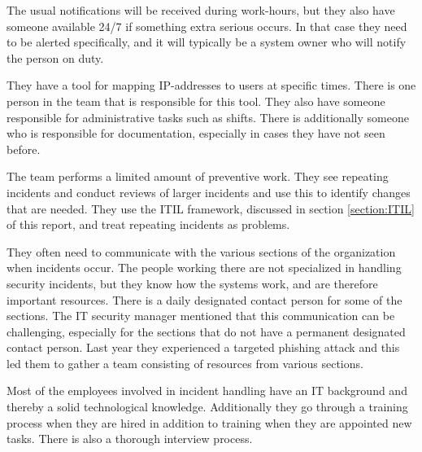 The usual notifications will be received during work-hours, but they also have someone available 24/7 if something extra serious occurs. In that case they need to be alerted specifically, and it will typically be a system owner who will notify the person on duty.

They have a tool for mapping IP-addresses to users at specific times. There is one person in the team that is responsible for this tool. They also have someone responsible for administrative tasks such as shifts. There is additionally someone who is responsible for documentation, especially in cases they have not seen before.

The team performs a limited amount of preventive work. They see repeating incidents and conduct reviews of larger incidents and use this to identify changes that are needed. They use the \ac{ITIL} framework, discussed in section \ref{section:ITIL} of this report, and treat repeating incidents as problems.

They often need to communicate with the various sections of the organization when incidents occur. The people working there are not specialized in handling security incidents, but they know how the systems work, and are therefore important resources. There is a daily designated contact person for some of the sections. The IT security manager mentioned that this communication can be challenging, especially for the sections that do not have a permanent designated contact person. Last year they experienced a targeted phishing attack and this led them to gather a team consisting of resources from various sections.

Most of the employees involved in incident handling have an IT background and thereby a solid technological knowledge. Additionally they go through a training process when they are hired in addition to training when they are appointed new tasks. There is also a thorough interview process.

